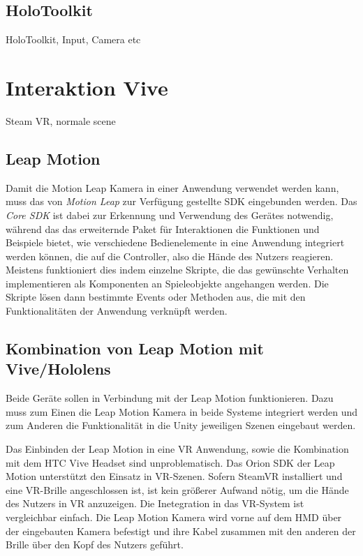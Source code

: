 \subsection{HoloToolkit}

HoloToolkit, Input, Camera etc
\section{Interaktion Vive}
Steam VR, normale scene

\subsection{Leap Motion}

Damit die Motion Leap Kamera in einer Anwendung verwendet werden kann, muss das von \textit{Motion Leap} zur Verfügung gestellte SDK eingebunden werden. Das \textit{Core SDK} ist dabei zur Erkennung und Verwendung des Gerätes notwendig, während das das erweiternde Paket für Interaktionen die Funktionen und Beispiele bietet, wie verschiedene Bedienelemente in eine Anwendung integriert werden können, die auf die Controller, also die Hände des Nutzers reagieren.
Meistens funktioniert dies indem einzelne Skripte, die das gewünschte Verhalten implementieren als Komponenten an Spieleobjekte angehangen werden. Die Skripte lösen dann bestimmte Events oder Methoden aus, die mit den Funktionalitäten der Anwendung verknüpft werden. 

\subsection{Kombination von Leap Motion mit Vive/Hololens}
\label{kombination}

Beide Geräte sollen in Verbindung mit der Leap Motion funktionieren. Dazu muss zum Einen die Leap Motion Kamera in beide Systeme integriert werden und zum Anderen die Funktionalität in die Unity jeweiligen Szenen eingebaut werden. 

Das Einbinden der Leap Motion in eine VR Anwendung, sowie die Kombination mit dem HTC Vive Headset sind unproblematisch. Das Orion SDK der Leap Motion unterstützt den Einsatz in VR-Szenen. Sofern SteamVR installiert und eine VR-Brille angeschlossen ist, ist kein größerer Aufwand nötig, um die Hände des Nutzers in VR anzuzeigen. 
Die Inetegration in das VR-System ist vergleichbar einfach. Die Leap Motion Kamera wird vorne auf dem HMD über der eingebauten Kamera befestigt und ihre Kabel zusammen mit den anderen der Brille über den Kopf des Nutzers geführt. 

